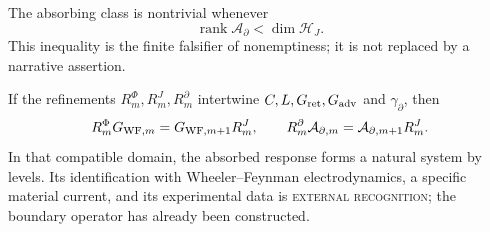The absorbing class is nontrivial whenever
\[
 \operatorname{rank}\mathcal A_\partial<\dim\mathcal H_J.
\]
This inequality is the finite falsifier of nonemptiness; it is not replaced by
a narrative assertion.

If the refinements \(R_m^\Phi,R_m^J,R_m^\partial\) intertwine
\(C,L,G_{\rm ret},G_{\rm adv}\) and \(\gamma_\partial\), then
\[
 R_m^\Phi G_{{\rm WF},m}
 =G_{{\rm WF},m+1}R_m^J,\qquad
 R_m^\partial\mathcal A_{\partial,m}
 =\mathcal A_{\partial,m+1}R_m^J.
\]
In that compatible domain, the absorbed response forms a natural system
by levels. Its identification with Wheeler--Feynman
electrodynamics, a specific material current, and its experimental data
is \textsc{external recognition}; the boundary operator has already been constructed.


